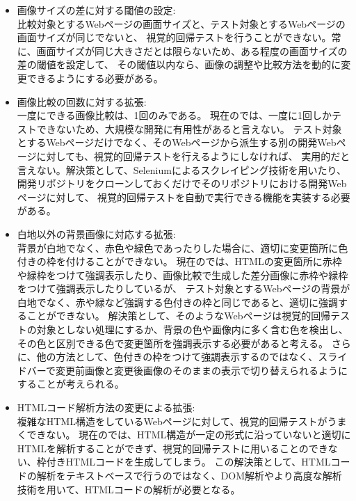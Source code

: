 \begin{itemize}
      \item 画像サイズの差に対する閾値の設定:\\
            比較対象とするWebページの画面サイズと、テスト対象とするWebページの画面サイズが同じでないと、
            視覚的回帰テストを行うことができない。常に、画面サイズが同じ大きさだとは限らないため、ある程度の画面サイズの差の閾値を設定して、
            その閾値以内なら、画像の調整や比較方法を動的に変更できるようにする必要がある。
      \item 画像比較の回数に対する拡張:\\
            一度にできる画像比較は、1回のみである。
            現在の\toolName では、一度に1回しかテストできないため、大規模な開発に有用性があると言えない。
            テスト対象とするWebページだけでなく、そのWebページから派生する別の開発Webページに対しても、視覚的回帰テストを行えるようにしなければ、
            実用的だと言えない。解決策として、Seleniumによるスクレイピング技術を用いたり、開発リポジトリをクローンしておくだけでそのリポジトリにおける開発Webページに対して、
            視覚的回帰テストを自動で実行できる機能を実装する必要がある。
      \item 白地以外の背景画像に対応する拡張:\\
            背景が白地でなく、赤色や緑色であったりした場合に、適切に変更箇所に色付きの枠を付けることができない。
            現在の\toolName では、HTMLの変更箇所に赤枠や緑枠をつけて強調表示したり、画像比較で生成した差分画像に赤枠や緑枠をつけて強調表示したりしているが、
            テスト対象とするWebページの背景が白地でなく、赤や緑など強調する色付きの枠と同じであると、適切に強調することができない。
            解決策として、そのようなWebページは視覚的回帰テストの対象としない処理にするか、背景の色や画像内に多く含む色を検出し、その色と区別できる色で変更箇所を強調表示する必要があると考える。
            さらに、他の方法として、色付きの枠をつけて強調表示するのではなく、スライドバーで変更前画像と変更後画像のそのままの表示で切り替えられるようにすることが考えられる。
      \item HTMLコード解析方法の変更による拡張:\\
            複雑なHTML構造をしているWebページに対して、視覚的回帰テストがうまくできない。
            現在の\toolName では、HTML構造が一定の形式に沿っていないと適切にHTMLを解析することができず、視覚的回帰テストに用いることのできない、枠付きHTMLコードを生成してしまう。
            この解決策として、HTMLコードの解析をテキストベースで行うのではなく、DOM解析やより高度な解析技術を用いて、HTMLコードの解析が必要となる。

\end{itemize}
